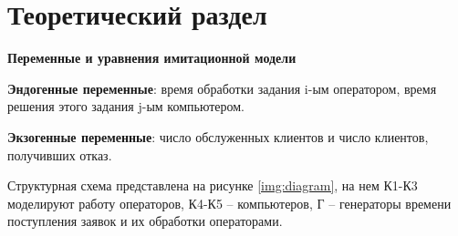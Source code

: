 \chapter{Теоретический раздел}

\textbf{Переменные и уравнения имитационной модели}  

\textbf{Эндогенные переменные}: время обработки задания i-ым оператором, время решения этого задания j-ым компьютером.

\textbf{Экзогенные переменные}: число обслуженных клиентов и число клиентов, получивших отказ.

Структурная схема представлена на рисунке \ref{img:diagram}, на нем К1-К3 моделируют работу операторов, К4-К5 -- компьютеров, Г -- генераторы времени поступления заявок и их обработки операторами.

